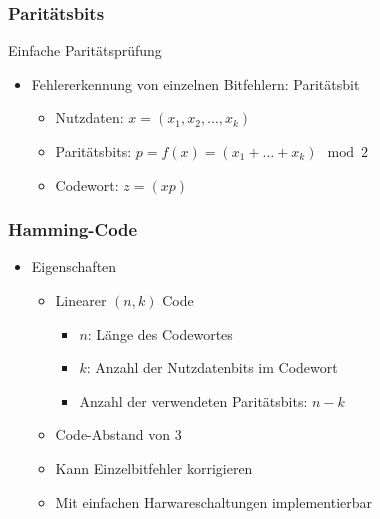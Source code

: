     \subsubsection{Paritätsbits}
      Einfache Paritätsprüfung
      \begin{itemize}
        \item Fehlererkennung von einzelnen Bitfehlern: Paritätsbit
          \begin{itemize}
            \item Nutzdaten: $x=(x_1,x_2,\dots,x_k)$
            \item Paritätsbits: $p=f(x)=(x_1+\dots+x_k)\mod 2$
            \item Codewort: $z=(xp)$
          \end{itemize}
      \end{itemize}
    \subsubsection{Hamming-Code}
      \begin{itemize}
        \item Eigenschaften
          \begin{itemize}
            \item Linearer $(n,k)$ Code
              \begin{itemize}
                \item $n$: Länge des Codewortes
                \item $k$: Anzahl der Nutzdatenbits im Codewort
                \item Anzahl der verwendeten Paritätsbits: $n-k$
              \end{itemize}
            \item Code-Abstand von 3
            \item Kann Einzelbitfehler korrigieren
            \item Mit einfachen Harwareschaltungen implementierbar
          \end{itemize}
      \end{itemize}
